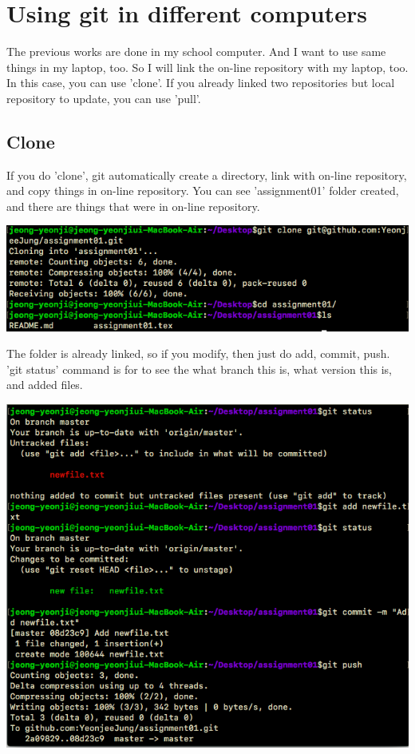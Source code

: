 \documentclass{article}
\begin{document}
\section{Using git in different computers}

The previous works are done in my school computer. And I want to use same things in my laptop, too. So I will link the on-line repository with my laptop, too. In this case, you can use 'clone'. If you already linked two repositories but local repository to update, you can use 'pull'.

\subsection{Clone}

If you do 'clone', git automatically create a directory, link with on-line repository, and copy things in on-line repository. You can see 'assignment01' folder created, and there are things that were in on-line repository.
\begin{center}
    \includegraphics[scale = 0.6]{pic/pic11.png}
\end{center}

\newpage
The folder is already linked, so if you modify, then just do add, commit, push. 'git status' command is for to see the what branch this is, what version this is, and added files.
\begin{center}
    \includegraphics[scale = 0.6]{pic/pic12.png}
\end{center}
\end{document}
